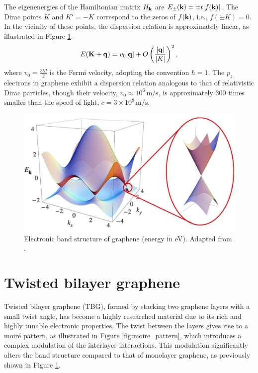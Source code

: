 The eigenenergies of the Hamiltonian matrix \(H_{\vb{k}}\) are \(E_\pm({\vb{k}}) = \pm t \abs{f({\vb{k}})}\). The Dirac points \(K\) and \(K' = -K\) correspond to the zeros of \(f({\vb{k}})\), i.e., \(f(\pm K) = 0\). In the vicinity of these points, the dispersion relation is approximately linear, as illustrated in Figure \ref{fig:monolayer_dispersion}.
\begin{equation} \label{eq:linear_Ek_monolayer}
E({\vb{K}} + {\vb{q}}) = v_0 \abs{{\vb{q}}} + O\left(\frac{\abs{{\vb{q}}}}{\abs{K}}\right)^2,
\end{equation}
where \( v_0 = \frac{3td}{2} \) is the Fermi velocity, adopting the convention \(\hbar = 1\). The \(p_z\) electrons in graphene exhibit a dispersion relation analogous to that of relativistic Dirac particles, though their velocity, \(v_0 \approx 10^6 \, \text{m/s}\), is approximately 300 times smaller than the speed of light, \(c = 3 \times 10^8 \, \text{m/s}\).

\begin{figure}[H]
\centering
\includegraphics[width=0.8\linewidth]{fig/monolayer_dispersion.png}
\caption{Electronic band structure of graphene (energy in eV). Adapted from \cite{geim2009}.}
\label{fig:monolayer_dispersion}
\end{figure}

\section{Twisted bilayer graphene} \label{sec:experimental_tbg}

Twisted bilayer graphene (TBG), formed by stacking two graphene layers with a small twist angle, has become a highly researched material due to its rich and highly tunable electronic properties. The twist between the layers gives rise to a moiré pattern, as illustrated in Figure \ref{fig:moire_pattern}, which introduces a complex modulation of the interlayer interactions. This modulation significantly alters the band structure compared to that of monolayer graphene, as previously shown in Figure \ref{fig:monolayer_dispersion}.

